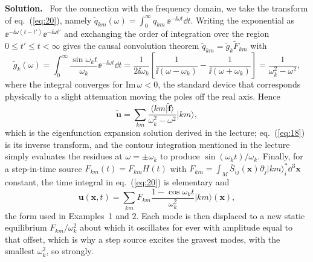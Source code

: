 \documentclass[a4paper,12pt]{paper}
\newenvironment{solution}{\par\noindent\textbf{Solution.}\ }{\par\medskip}
\begin{document}
\begin{solution}
For the connection with the frequency domain, we take the transform of eq.~(\ref{eq:20}),
namely $\tilde{q}_{km}(\omega)=\int_{0}^{\infty}q_{km}\,\ee^{-\ii\omega t}\dd t$. Writing the exponential
as $\ee^{-\ii\omega(t-t')}\ee^{-\ii\omega t'}$ and exchanging the order of integration over the
region $0\le t'\le t<\infty$ gives the causal convolution theorem
$\tilde{q}_{km}=\tilde{g}_{k}\tilde{F}_{km}$ with
\begin{equation}
\tilde{g}_{k}(\omega)=\int_{0}^{\infty}\frac{\sin\omega_{k}t}{\omega_{k}}\ee^{-\ii\omega t}\dd t
=\frac{1}{2\ii\omega_{k}}\left[\frac{1}{\ii(\omega-\omega_{k})}-\frac{1}{\ii(\omega+\omega_{k})}\right]
=\frac{1}{\omega_{k}^{2}-\omega^{2}},
\label{eq:25}
\end{equation}
where the integral converges for $\mathrm{Im}\,\omega<0$, the standard device that corresponds physically
to a slight attenuation moving the poles off the real axis. Hence
\begin{equation}
\tilde{\mathbf{u}}=\sum_{km}\frac{\langle km|\tilde{\mathbf{f}}\rangle}{\omega_{k}^{2}-\omega^{2}}|km\rangle,
\label{eq:26}
\end{equation}
which is the eigenfunction expansion solution derived in the lecture; eq.~(\ref{eq:18}) is its inverse
transform, and the contour integration mentioned in the lecture simply evaluates the residues at
$\omega=\pm\omega_{k}$ to produce $\sin(\omega_{k}t)/\omega_{k}$. Finally, for a step-in-time source
$F_{km}(t)=F_{km}H(t)$ with $F_{km}=\int_{M}\overline{S}_{ij}(\mathbf{x})\partial_{j}|km\rangle_{i}^{*}\dd^{3}\mathbf{x}$
constant, the time integral in eq.~(\ref{eq:20}) is elementary and
\begin{equation}
\mathbf{u}(\mathbf{x},t)=\sum_{km}F_{km}\frac{1-\cos\omega_{k}t}{\omega_{k}^{2}}|km\rangle(\mathbf{x}),
\label{eq:27}
\end{equation}
the form used in Examples~1 and 2. Each mode is then displaced to a new static equilibrium
$F_{km}/\omega_{k}^{2}$ about which it oscillates for ever with amplitude equal to that offset, which is why
a step source excites the gravest modes, with the smallest $\omega_{k}^{2}$, so strongly.
\end{solution}
\end{document}
